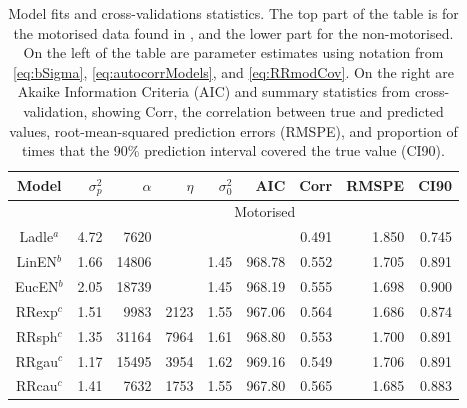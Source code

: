 \documentclass[11pt, titlepage]{article}\usepackage[]{graphicx}\usepackage[]{color}
\begin{document}
\begin{spacing}{1.9}
\begin{flushleft}
\newpage





\newpage
\begin{table}[ht]
				\caption{Model fits and cross-validations statistics. The top part of the table is for the motorised data found in \citet{Ladl:Avga:Whea:Boyc:pred:2016}, and the lower part for the non-motorised. On the left of the table are parameter estimates using notation from \ref{eq:bSigma}, \ref{eq:autocorrModels}, and \ref{eq:RRmodCov}. On the right are Akaike Information Criteria (AIC) and summary statistics from cross-validation, showing Corr, the correlation between true and predicted values, root-mean-squared prediction errors (RMSPE), and proportion of times that the 90\% prediction interval covered the true value (CI90).  \label{Tab:CVstats}}
\begin{center}
\begin{tabular}{c|rrrr|rrrr}
  \hline
  \hline
  Model & $\sigma^2_p$ & $\alpha$ & $\eta$ & $\sigma^2_0$ & AIC & Corr & RMSPE & CI90 \\
	\hline
	& \multicolumn{8}{c}{Motorised} \\
  \hline
Ladle$^a$ & 4.72 & 7620 &  &  &  & 0.491 & 1.850 & 0.745 \\ 
  LinEN$^b$ & 1.66 & 14806 &  & 1.45 & 968.78 & 0.552 & 1.705 & 0.891 \\ 
  EucEN$^b$ & 2.05 & 18739 &  & 1.45 & 968.19 & 0.555 & 1.698 & 0.900 \\ 
  RRexp$^c$ & 1.51 & 9983 & 2123 & 1.55 & 967.06 & 0.564 & 1.686 & 0.874 \\ 
  RRsph$^c$ & 1.35 & 31164 & 7964 & 1.61 & 968.80 & 0.553 & 1.700 & 0.891 \\ 
  RRgau$^c$ & 1.17 & 15495 & 3954 & 1.62 & 969.16 & 0.549 & 1.706 & 0.891 \\ 
  RRcau$^c$ & 1.41 & 7632 & 1753 & 1.55 & 967.80 & 0.565 & 1.685 & 0.883 \\ 
   \hline


\end{tabular}
\end{center}
\end{table}
\end{flushleft}
\end{spacing}
\end{document}
